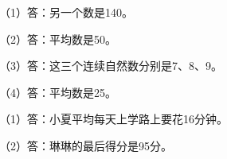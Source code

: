 
\begingroup\color{answerred}\noindent（1）答：另一个数是140。\par
\noindent（2）答：平均数是50。\par
\noindent（3）答：这三个连续自然数分别是7、8、9。\par
\noindent（4）答：平均数是25。\par\par\endgroup
{}
\begingroup\color{answerred}\noindent（1）答：小夏平均每天上学路上要花16分钟。\par
\noindent（2）答：琳琳的最后得分是95分。\par\par\endgroup
